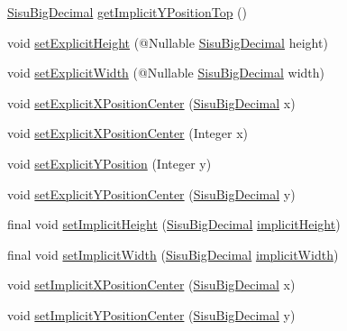 \begin{DoxyCompactItemize}
\item 
\hyperlink{classcom_1_1aarrelaakso_1_1drawl_1_1_sisu_big_decimal}{Sisu\+Big\+Decimal} \hyperlink{classcom_1_1aarrelaakso_1_1drawl_1_1_shape_a5ffc02627cca0723e3555b5d04ba2b75}{get\+Implicit\+Y\+Position\+Top} ()
\item 
void \hyperlink{classcom_1_1aarrelaakso_1_1drawl_1_1_shape_a37e0c4b85c07c4c87a24609ae1cb50a5}{set\+Explicit\+Height} (@Nullable \hyperlink{classcom_1_1aarrelaakso_1_1drawl_1_1_sisu_big_decimal}{Sisu\+Big\+Decimal} height)
\item 
void \hyperlink{classcom_1_1aarrelaakso_1_1drawl_1_1_shape_a976c002388892d227697cab39c1e5724}{set\+Explicit\+Width} (@Nullable \hyperlink{classcom_1_1aarrelaakso_1_1drawl_1_1_sisu_big_decimal}{Sisu\+Big\+Decimal} width)
\item 
void \hyperlink{classcom_1_1aarrelaakso_1_1drawl_1_1_shape_a8e4c74480fede49f44519554136c12b0}{set\+Explicit\+X\+Position\+Center} (\hyperlink{classcom_1_1aarrelaakso_1_1drawl_1_1_sisu_big_decimal}{Sisu\+Big\+Decimal} x)
\item 
void \hyperlink{classcom_1_1aarrelaakso_1_1drawl_1_1_shape_aa7855df6d98b3bfa556b7d857755181b}{set\+Explicit\+X\+Position\+Center} (Integer x)
\item 
void \hyperlink{classcom_1_1aarrelaakso_1_1drawl_1_1_shape_af8af5129e3e61324439a1035428016a2}{set\+Explicit\+Y\+Position} (Integer y)
\item 
void \hyperlink{classcom_1_1aarrelaakso_1_1drawl_1_1_shape_a0ddc58345fca924e973fac474955ef14}{set\+Explicit\+Y\+Position\+Center} (\hyperlink{classcom_1_1aarrelaakso_1_1drawl_1_1_sisu_big_decimal}{Sisu\+Big\+Decimal} y)
\item 
final void \hyperlink{classcom_1_1aarrelaakso_1_1drawl_1_1_shape_ad41ecfc8ce74638066d8a21c97e3f399}{set\+Implicit\+Height} (\hyperlink{classcom_1_1aarrelaakso_1_1drawl_1_1_sisu_big_decimal}{Sisu\+Big\+Decimal} \hyperlink{classcom_1_1aarrelaakso_1_1drawl_1_1_shape_ab374c520d98692018b1a5866acd33849}{implicit\+Height})
\item 
final void \hyperlink{classcom_1_1aarrelaakso_1_1drawl_1_1_shape_a6ec4c2bd26d08f0a1545bd1d5f47c05a}{set\+Implicit\+Width} (\hyperlink{classcom_1_1aarrelaakso_1_1drawl_1_1_sisu_big_decimal}{Sisu\+Big\+Decimal} \hyperlink{classcom_1_1aarrelaakso_1_1drawl_1_1_shape_a100066b3ccbb6e88080211b00ad8ebb9}{implicit\+Width})
\item 
void \hyperlink{classcom_1_1aarrelaakso_1_1drawl_1_1_shape_a4fbc0d430cfe312e018e4ec58f726842}{set\+Implicit\+X\+Position\+Center} (\hyperlink{classcom_1_1aarrelaakso_1_1drawl_1_1_sisu_big_decimal}{Sisu\+Big\+Decimal} x)
\item 
void \hyperlink{classcom_1_1aarrelaakso_1_1drawl_1_1_shape_ac1cf4cf6f0bcc489b996a10a600d5629}{set\+Implicit\+Y\+Position\+Center} (\hyperlink{classcom_1_1aarrelaakso_1_1drawl_1_1_sisu_big_decimal}{Sisu\+Big\+Decimal} y)
\end{DoxyCompactItemize}
